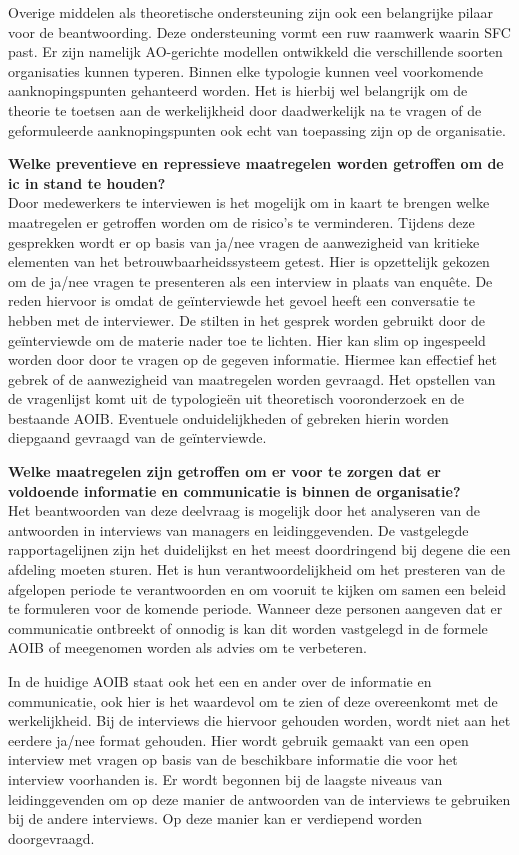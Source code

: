 Overige middelen als theoretische ondersteuning zijn ook een belangrijke pilaar voor de beantwoording. Deze ondersteuning vormt een ruw raamwerk waarin SFC past. Er zijn namelijk AO-gerichte modellen ontwikkeld die verschillende soorten organisaties kunnen typeren. Binnen elke typologie kunnen veel voorkomende aanknopingspunten gehanteerd worden. Het is hierbij wel belangrijk om de theorie te toetsen aan de werkelijkheid door daadwerkelijk na te vragen of de geformuleerde aanknopingspunten ook echt van toepassing zijn op de organisatie.

\bigskip \noindent
\textbf{Welke preventieve en repressieve maatregelen worden getroffen om de \gls{ic} in stand te houden?} \\
Door medewerkers te interviewen is het mogelijk om in kaart te brengen welke maatregelen er getroffen worden om de risico's te verminderen. Tijdens deze gesprekken wordt er op basis van ja/nee vragen de aanwezigheid van kritieke elementen van het betrouwbaarheidssysteem getest. Hier is opzettelijk gekozen om de ja/nee vragen te presenteren als een interview in plaats van enquête. De reden hiervoor is omdat de geïnterviewde het gevoel heeft een conversatie te hebben met de interviewer. De stilten in het gesprek worden gebruikt door de geïnterviewde om de materie nader toe te lichten. Hier kan slim op ingespeeld worden door door te vragen op de gegeven informatie. Hiermee kan effectief het gebrek of de aanwezigheid van maatregelen worden gevraagd. Het opstellen van de vragenlijst komt uit de typologieën uit theoretisch vooronderzoek en de bestaande AOIB. Eventuele onduidelijkheden of gebreken hierin worden diepgaand gevraagd van de geïnterviewde. 

\bigskip \noindent
\textbf{Welke maatregelen zijn getroffen om er voor te zorgen dat er voldoende informatie en communicatie is binnen de organisatie?} \\
Het beantwoorden van deze deelvraag is mogelijk door het analyseren van de antwoorden in interviews van managers en leidinggevenden. De vastgelegde rapportagelijnen zijn het duidelijkst en het meest doordringend bij degene die een afdeling moeten sturen. Het is hun verantwoordelijkheid om het presteren van de afgelopen periode te verantwoorden en om vooruit te kijken om samen een beleid te formuleren voor de komende periode. Wanneer deze personen aangeven dat er communicatie ontbreekt of onnodig is kan dit worden vastgelegd in de formele AOIB of meegenomen worden als advies om te verbeteren. 

In de huidige AOIB staat ook het een en ander over de informatie en communicatie, ook hier is het waardevol om te zien of deze overeenkomt met de werkelijkheid. Bij de interviews die hiervoor gehouden worden, wordt niet aan het eerdere ja/nee format gehouden. Hier wordt gebruik gemaakt van een open interview met vragen op basis van de beschikbare informatie die voor het interview voorhanden is. Er wordt begonnen bij de laagste niveaus van leidinggevenden om op deze manier de antwoorden van de interviews te gebruiken bij de andere interviews. Op deze manier kan er verdiepend worden doorgevraagd.

